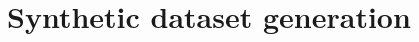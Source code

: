 \documentclass[10pt,aspectratio=169,dvipsnames]{beamer} %
\begin{document}
%
%	
\section{Synthetic dataset generation}
\end{document}
